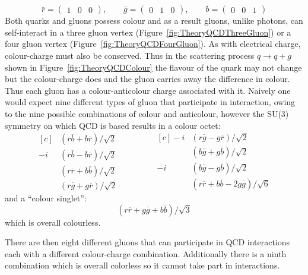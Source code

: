 \begin{equation}
\bar{r}=\begin{pmatrix}
  1 &
  0 &
  0 
\end{pmatrix},
\qquad
\bar{g}=\begin{pmatrix}
  0 &
  1 &
  0 
\end{pmatrix},
\qquad
\bar{b}=\begin{pmatrix}
  0 &
  0 &
  1 
\end{pmatrix}
\end{equation}
Both quarks and gluons possess colour and as a result gluons, unlike photons, can self-interact in a three gluon vertex (Figure~\ref{fig:TheoryQCDThreeGluon}) or a four gluon vertex (Figure~\ref{fig:TheoryQCDFourGluon}). As with electrical charge, colour-charge must also be conserved. Thus in the scattering process $q\rightarrow q+g$ shown in Figure~\ref{fig:TheoryQCDColour} the flavour of the quark may not change but the colour-charge does and the gluon carries away the difference in colour. Thus each gluon has a colour-anticolour charge associated with it. Naively one would expect nine different types of gluon that participate in interaction, owing to the nine possible combinations of colour and anticolour, however the SU(3) symmetry on which QCD is based results in a colour octet:
\begin{equation*}
\begin{aligned}[c]
  &(r\overline{b}+b\overline{r})/\sqrt{2} \\
  -i&(r\overline{b}-b\overline{r})/\sqrt{2} \\
  &(r\overline{r}+b\overline{b})/\sqrt{2} \\
  &(r\overline{g}+g\overline{r})/\sqrt{2}
\end{aligned}
\qquad\qquad
\begin{aligned}[c]
  -i&(r\overline{g}-g\overline{r})/\sqrt{2} \\
  &(b\overline{g}+g\overline{b})/\sqrt{2} \\
  -i&(b\overline{g}-g\overline{b})/\sqrt{2} \\
  &(r\overline{r}+b\overline{b}-2g\overline{g})/\sqrt{6}
\end{aligned}
\end{equation*}
%
and a ``colour singlet'':
%
\begin{equation}
  (r\overline{r} + g\overline{g} + b\overline{b})/\sqrt{3}
\end{equation}
%
which is overall colourless.

There are then eight different gluons that can participate in QCD interactions each with a different colour-charge combination. Additionally there is a ninth combination which is overall colorless so it cannot take part in interactions.

